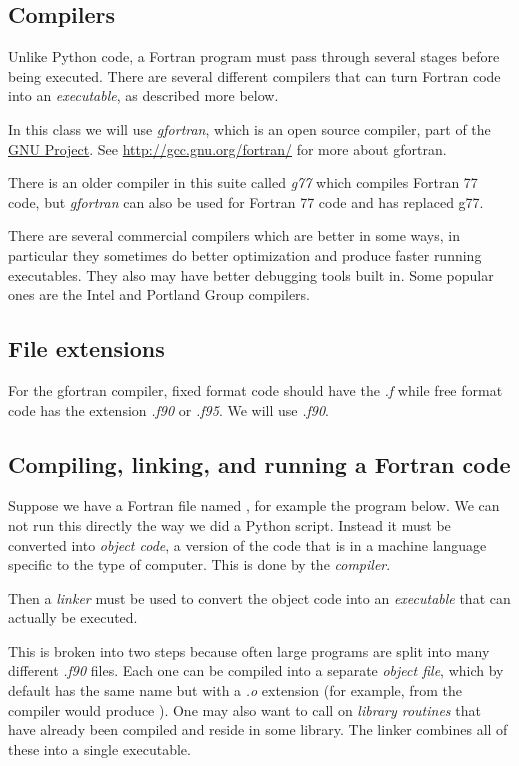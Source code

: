 \documentclass[letterpaper,10pt,english]{sphinxmanual}
\begin{document}
\subsection{Compilers}
\label{fortran:fortran-compilers}\label{fortran:compilers}
Unlike Python code, a Fortran program must pass through several
stages before being executed.  There are several different compilers
that can turn Fortran code into an \emph{executable}, as described more
below.

In this class we will use \emph{gfortran}, which is an open source
compiler, part of the \href{http://www.gnu.org/}{GNU Project}.
See \url{http://gcc.gnu.org/fortran/} for more about gfortran.

There is an older compiler in this suite called \emph{g77} which
compiles Fortran 77 code, but \emph{gfortran} can also be used for Fortran
77 code and has replaced g77.

There are several commercial compilers which are better in some ways,
in particular they sometimes do better optimization and produce
faster running executables.  They also may have better debugging
tools built in.  Some popular ones are the Intel and Portland Group
compilers.


\subsection{File extensions}
\label{fortran:file-extensions}
For the gfortran compiler, fixed format code should have the
\emph{.f} while free format code has the extension \emph{.f90} or \emph{.f95}.  We
will use \emph{.f90}.


\subsection{Compiling, linking, and running a Fortran code}
\label{fortran:fortran-compiling}\label{fortran:compiling-linking-and-running-a-fortran-code}
Suppose we have a Fortran file named , for example the
program below.  We can not run this directly the way we did a Python
script.  Instead it must be converted into \emph{object code}, a version
of the code that is in a machine language specific to the type of
computer.  This is done by the \emph{compiler}.

Then a \emph{linker} must be used to convert the object code into an
\emph{executable} that can actually be executed.

This is broken into two steps because often large programs are split
into many different \emph{.f90} files.  Each one can be compiled into a
separate \emph{object file}, which by default has the same name but with a
\emph{.o} extension (for example, from  the compiler would
produce ).  One may also want to call on \emph{library routines} that
have already been compiled and reside in some library.  The linker
combines all of these into a single executable.
\end{document}
